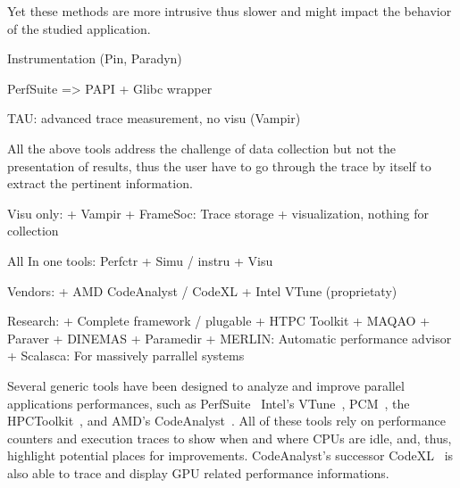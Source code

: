 Yet these methods are more intrusive thus slower and might
impact the behavior of the studied application.



Instrumentation (Pin, Paradyn)

PerfSuite => PAPI + Glibc wrapper


TAU: advanced trace measurement, no visu (Vampir)


All the above tools address the challenge of data collection but not the
presentation of results, thus the user have to go through the trace by itself
to extract the pertinent information.


Visu only:
    + Vampir
    + FrameSoc: Trace storage + visualization, nothing for collection

All In one tools: Perfctr + Simu / instru + Visu

Vendors:
    + AMD CodeAnalyst / CodeXL
    + Intel VTune (proprietaty)

Research:
    + Complete framework / plugable
        + HTPC Toolkit
        + MAQAO
        + Paraver
            + DINEMAS
            + Paramedir
    + MERLIN: Automatic performance advisor
    + Scalasca: For massively parrallel systems

Several generic tools have been designed to analyze and improve parallel
applications performances, such as \gls{PerfSuite}~\cite{Kufrin05Perfsuite}
\gls{Intel}'s \gls{VTune}~\cite{Reinders05VTune},
\gls{PCM}~\cite{Wilhalm16Intel}, the
\gls{HPCToolkit}~\cite{Adhianto10HPCTOOLKIT}, and \gls{AMD}'s
\gls{CodeAnalyst}~\cite{Drongowski08introduction}. All of these tools rely on
performance counters and execution traces to show when and where CPUs are
idle, and, thus, highlight potential places for improvements.
\gls{CodeAnalyst}'s successor \gls{CodeXL}~\cite{AMDCodeXL} is also able to
trace and display \gls{GPU} related performance informations.

